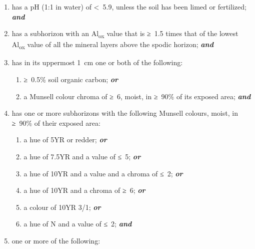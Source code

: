 \documentclass[
  letterpaper,
  DIV=11,
  numbers=noendperiod]{scrreprt}
\providecommand{\tightlist}{%
  \setlength{\itemsep}{0pt}\setlength{\parskip}{0pt}}\usepackage{longtable,booktabs,array}
\begin{document}
\begin{enumerate}
\def\labelenumi{\arabic{enumi}.}
\item
  has a pH (1:1 in water) of \textless~5.9, unless the soil has been
  limed or fertilized; \textbf{\emph{and}}
\item
  has a subhorizon with an Al\textsubscript{ox} value that is ≥~1.5
  times that of the lowest Al\textsubscript{ox} value of all the mineral
  layers above the spodic horizon; \textbf{\emph{and}}
\item
  has in its uppermost 1~cm one or both of the following:

  \begin{enumerate}
  \def\labelenumii{\alph{enumii}.}
  \tightlist
  \item
    ≥~0.5\% soil organic carbon; \textbf{\emph{or}}
  \item
    a Munsell colour chroma of ≥~6, moist, in ≥~90\% of its exposed
    area; \textbf{\emph{and}}
  \end{enumerate}
\item
  has one or more subhorizons with the following Munsell colours, moist,
  in ≥~90\% of their exposed area:

  \begin{enumerate}
  \def\labelenumii{\alph{enumii}.}
  \tightlist
  \item
    a hue of 5YR or redder; \textbf{\emph{or}}
  \item
    a hue of 7.5YR and a value of ≤~5; \textbf{\emph{or}}
  \item
    a hue of 10YR and a value and a chroma of ≤~2; \textbf{\emph{or}}
  \item
    a hue of 10YR and a chroma of ≥~6; \textbf{\emph{or}}
  \item
    a colour of 10YR 3/1; \textbf{\emph{or}}
  \item
    a hue of N and a value of ≤~2; \textbf{\emph{and}}
  \end{enumerate}
\item
  one or more of the following:


\end{enumerate}
\end{document}
